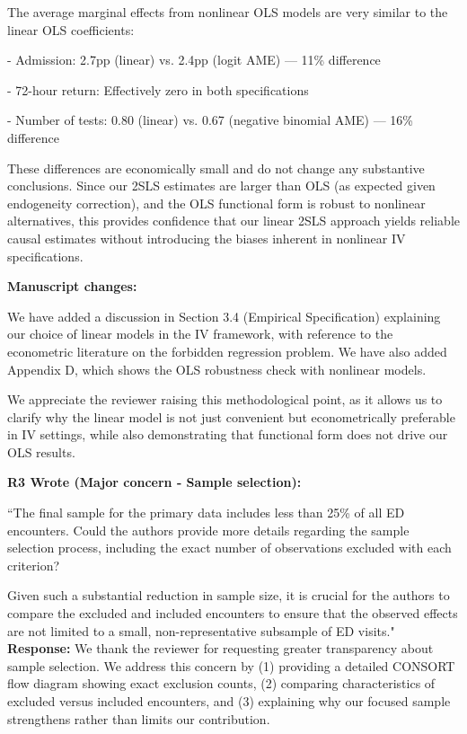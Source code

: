 \documentclass[11pt]{article}
\newenvironment{quote2}
{ \bigskip
\noindent
         \small\em
         \baselineskip=14pt
}
\newcommand{\1}{\hbox{\rm 1\kern-.35em 1}}
\begin{document}
The average marginal effects from nonlinear OLS models are very similar to the linear OLS coefficients:

- Admission: 2.7pp (linear) vs. 2.4pp (logit AME) — 11\% difference

- 72-hour return: Effectively zero in both specifications  

- Number of tests: 0.80 (linear) vs. 0.67 (negative binomial AME) — 16\% difference

These differences are economically small and do not change any substantive conclusions. Since our 2SLS estimates are larger than OLS (as expected given endogeneity correction), and the OLS functional form is robust to nonlinear alternatives, this provides confidence that our linear 2SLS approach yields reliable causal estimates without introducing the biases inherent in nonlinear IV specifications.

\textbf{Manuscript changes:}

We have added a discussion in Section 3.4 (Empirical Specification) explaining our choice of linear models in the IV framework, with reference to the econometric literature on the forbidden regression problem. We have also added Appendix D, which shows the OLS robustness check with nonlinear models.

We appreciate the reviewer raising this methodological point, as it allows us to clarify why the linear model is not just convenient but econometrically preferable in IV settings, while also demonstrating that functional form does not drive our OLS results.

\color{black}


\begin{quote2}
\textbf{R3 Wrote (Major concern -  Sample selection):}  

\noindent``The final sample for the primary data includes less than 25\% of all ED encounters. Could the authors provide more details regarding the sample selection process, including the exact number of observations excluded with each criterion? 

Given such a substantial reduction in sample size, it is crucial for the authors to compare the excluded and included encounters to ensure that the observed effects are not limited to a small, non-representative subsample of ED visits."
\end{quote2}


\noindent\textbf{Response:} \color{blue}We thank the reviewer for requesting greater transparency about sample selection. We address this concern by (1) providing a detailed CONSORT flow diagram showing exact exclusion counts, (2) comparing characteristics of excluded versus included encounters, and (3) explaining why our focused sample strengthens rather than limits our contribution.
\end{document}
